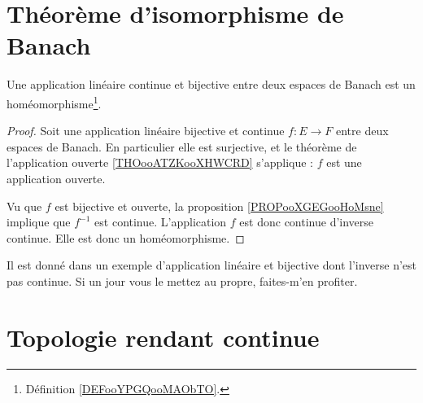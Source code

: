 

\section{Théorème d'isomorphisme de Banach}

\begin{theorem}  \label{ThofQShsw}
	Une application linéaire continue et bijective entre deux espaces de Banach est un homéomorphisme\footnote{Définition \ref{DEFooYPGQooMAObTO}.}.
\end{theorem}

\begin{proof}
	Soit une application linéaire bijective et continue \( f\colon E\to F\) entre deux espaces de Banach. En particulier elle est surjective, et le théorème de l'application ouverte \ref{THOooATZKooXHWCRD} s'applique : \( f\) est une application ouverte.

	Vu que \( f\) est bijective et ouverte, la proposition \ref{PROPooXGEGooHoMsne} implique que \( f^{-1}\) est continue. L'application \( f\) est donc continue d'inverse continue. Elle est donc un homéomorphisme.
\end{proof}

\begin{probleme}
	Il est donné dans \cite{BIBooQRUCooMqayTg} un exemple d'application linéaire et bijective dont l'inverse n'est pas continue. Si un jour vous le mettez au propre, faites-m'en profiter.
\end{probleme}

\section{Topologie rendant continue}

